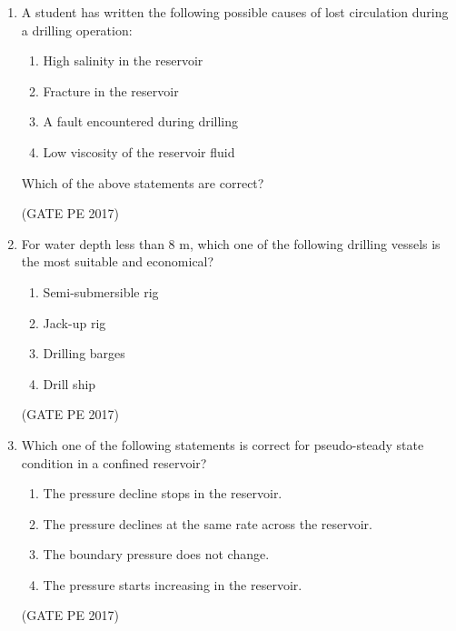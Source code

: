 \documentclass[journal,12pt,onecolumn]{IEEEtran}
\theoremstyle{remark}
\begin{document}
\begin{enumerate}[start=1, label={Q\arabic*.}]
\item A student has written the following possible causes of lost circulation during a drilling operation:
\begin{enumerate}
\item High salinity in the reservoir \\
\item Fracture in the reservoir \\
\item A fault encountered during drilling \\
\item Low viscosity of the reservoir fluid
\end{enumerate}

Which of the above statements are correct?
\begin{enumerate}
\end{enumerate}
\hfill{(GATE PE 2017)}

\item For water depth less than 8 m, which one of the following drilling vessels is the most suitable and economical?
\begin{enumerate}[label=(\Alph*)]
    \item Semi-submersible rig
    \item Jack-up rig
    \item Drilling barges
    \item Drill ship
\end{enumerate}
\hfill{(GATE PE 2017)}

\item Which one of the following statements is correct for pseudo-steady state condition in a confined reservoir?
\begin{enumerate}[label=(\Alph*)]
\item The pressure decline stops in the reservoir.
\item The pressure declines at the same rate across the reservoir.
\item The boundary pressure does not change.
\item The pressure starts increasing in the reservoir.
\end{enumerate}
\hfill{(GATE PE 2017)}


\end{enumerate}
\end{document}
